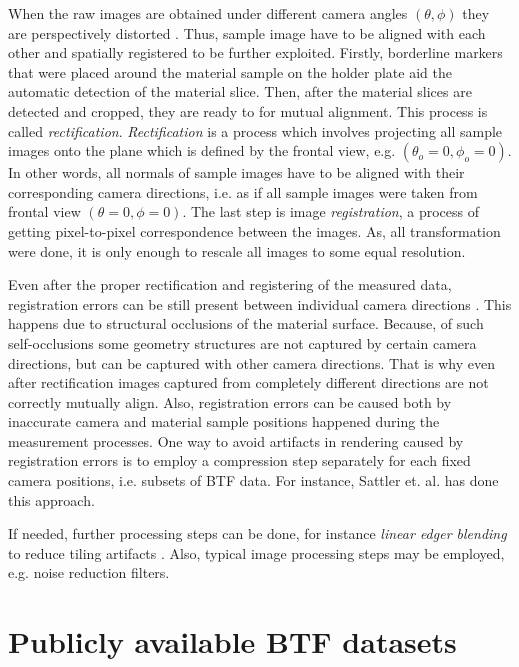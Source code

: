 When the raw images are obtained under different camera angles $(\theta,\phi)$ they are perspectively distorted \cite{sattler-2003-efficient}.
Thus, sample image have to be aligned with each other and spatially registered to be further exploited.
Firstly, borderline markers that were placed around the material sample on the holder plate aid the automatic detection of the material slice.
Then, after the material slices are detected and cropped, they are ready to for mutual alignment. This process is called  \emph{rectification}. 
\emph{Rectification} is a process which involves projecting all sample images onto the plane which is defined by the frontal view, e.g. $(\theta _{o} =0,\phi _{o}=0)$.
In other words, all normals of sample images have to be aligned with their corresponding camera directions, i.e. as if all sample images were taken from frontal view $(\theta =0,\phi=0)$.
The last step is image \emph{registration}, a process of getting pixel-to-pixel correspondence between the images.
 As, all transformation were done, it is only enough to rescale all images to some equal resolution.


Even after the proper rectification and registering of the measured data, registration errors can be still present between individual camera directions \cite{haindl_visual}. 
 This happens due to structural occlusions of the material surface. Because, of such self-occlusions some geometry structures are not captured by certain camera directions, 
 but can be captured with other camera directions.
 That is why even after rectiﬁcation images captured from completely different directions are not correctly mutually align. 
Also, registration errors can be caused both by inaccurate camera and material sample positions happened during the measurement processes.
One way to avoid artifacts in rendering caused by registration errors is to employ a compression step separately for each fixed camera positions, i.e. subsets of BTF data. 
 For instance, Sattler et. al. \cite{sattler-2003-efficient} has done this approach.


If needed, further processing steps can be done, for instance \emph{linear edger blending} to reduce tiling artifacts \cite{sattler-2003-efficient}.
Also, typical image processing steps may be employed, e.g. noise reduction filters. 


\section{Publicly available BTF datasets}
\label{section:Publicly_datasets}	

